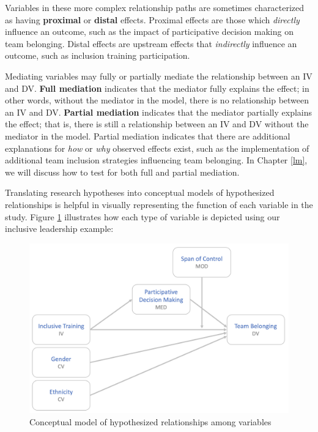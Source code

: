 \documentclass[
]{book}
\begin{document}
Variables in these more complex relationship paths are sometimes characterized as having \textbf{proximal} or \textbf{distal} effects. Proximal effects are those which \emph{directly} influence an outcome, such as the impact of participative decision making on team belonging. Distal effects are upstream effects that \emph{indirectly} influence an outcome, such as inclusion training participation.

Mediating variables may fully or partially mediate the relationship between an IV and DV. \textbf{Full mediation} indicates that the mediator fully explains the effect; in other words, without the mediator in the model, there is no relationship between an IV and DV. \textbf{Partial mediation} indicates that the mediator partially explains the effect; that is, there is still a relationship between an IV and DV without the mediator in the model. Partial mediation indicates that there are additional explanations for \emph{how} or \emph{why} observed effects exist, such as the implementation of additional team inclusion strategies influencing team belonging. In Chapter \ref{lm}, we will discuss how to test for both full and partial mediation.

Translating research hypotheses into conceptual models of hypothesized relationships is helpful in visually representing the function of each variable in the study. Figure \ref{fig:concept-mdl} illustrates how each type of variable is depicted using our inclusive leadership example:

\begin{figure}

{\centering \includegraphics[width=0.75\linewidth]{graphics/conceptual_model} 

}

\caption{Conceptual model of hypothesized relationships among variables}\label{fig:concept-mdl}
\end{figure}
\end{document}
